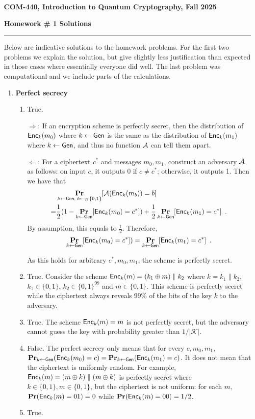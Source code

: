 \documentclass[12pt]{article}
\newcommand{\header}[1]{\begin{center} {\large\bf #1} \end{center}}
\begin{document}
\header{COM-440, Introduction to Quantum Cryptography, Fall 2025}
{\bf Homework \# 1 Solutions} 


\medskip

\hrule

 
\medskip

Below are indicative solutions to the homework problems. For the first two problems we explain the solution, but give slightly less justification than expected in those cases where essentially everyone did well. The last problem was computational and we include parts of the calculations. 

\begin{enumerate}

	
\item {\bf Perfect secrecy}
\begin{enumerate}
	\item True. 
	
	$\Rightarrow$: If an encryption scheme is perfectly secret, then the distribution of $\mathsf{Enc}_{k}(m_0)$ where $k \gets \mathsf{Gen}$ is the same as the distribution of $\mathsf{Enc}_{k}(m_1)$ where $k \gets \mathsf{Gen}$, and thus no function $\mathcal{A}$ can tell them apart.
	
	$\Leftarrow$: For a ciphertext $c^*$ and messages $m_0, m_1$, construct an adversary  $\mathcal{A}$ as follows: on input $c$, it outputs 0 if $c \ne c^*$; otherwise, it outputs 1. Then we have that
	\begin{align*}
	&\mathop{\bf Pr\/}_{k \gets \mathsf{Gen},\; b \gets_U \{0,1\}}[\mathcal{A}(\mathsf{Enc}_{k}(m_{b}))
    = b]\\
    =& \frac{1}{2}(1 - \mathop{\bf Pr\/}_{k \gets \mathsf{Gen}}[\mathsf{Enc}_{k}(m_{0}) = c^*]) + \frac{1}{2}\mathop{\bf Pr\/}_{k \gets \mathsf{Gen}}[\mathsf{Enc}_{k}(m_{1}) = c^*]\enspace.
	\end{align*}
	By assumption, this equals to $\frac{1}{2}$. Therefore,
	\[\mathop{\bf Pr\/}_{k \gets \mathsf{Gen}}[\mathsf{Enc}_{k}(m_{0}) = c^*]) = \mathop{\bf Pr\/}_{k \gets \mathsf{Gen}}[\mathsf{Enc}_{k}(m_{1}) = c^*]\enspace.\]
	
	As this holds for arbitrary $c^*, m_0, m_1$, the scheme is perfectly secret.
	\item True. Consider the scheme $\mathsf{Enc}_{k}(m) = (k_1 \oplus m) \parallel k_2$ where $k = k_1 \parallel k_2$, $k_1 \in \{0, 1\}$, $k_2 \in \{0, 1\}^{99}$ and $m \in \{0, 1\}$. This scheme is perfectly secret while the ciphertext always reveals 99\% of the bits of the key $k$ to the adversary.
	\item True. The scheme $\mathsf{Enc}_{k}(m) = m$ is not perfectly secret, but the adversary cannot guess the key with probability greater than $1/|\mathcal{K}|$.
	\item False. The perfect secrecy only means that for every $c, m_0, m_1$, $\mathop{\bf Pr\/}_{k \gets \mathsf{Gen}}(\mathsf{Enc}_{k}(m_0)= {c}) = \mathop{\bf Pr\/}_{k \gets \mathsf{Gen}}(\mathsf{Enc}_{k}(m_1)= {c})$. It does not mean that the ciphertext is uniformly random. For example, $\mathsf{Enc}_{k}(m) = (m \oplus k) \parallel (m \oplus k)$ is perfectly secret where $k \in \{0, 1\}, m \in \{0, 1\}$, but the ciphertext is not uniform: for each $m$, $\mathop{\bf Pr\/}(\mathsf{Enc}_{k}(m) = 01) = 0$ while $\mathop{\bf Pr\/}(\mathsf{Enc}_{k}(m) = 00) = 1/2$.
	\item True.
	

\end{enumerate}
\end{enumerate}
\end{document}
